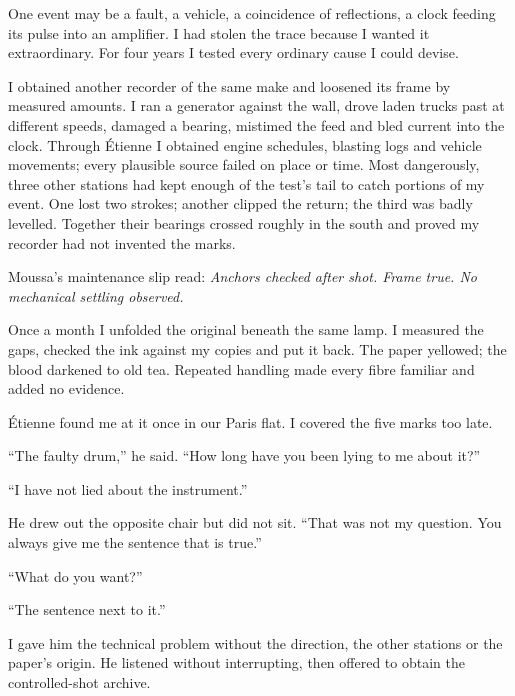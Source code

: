 One event may be a fault, a vehicle, a coincidence of reflections, a clock feeding its pulse into an amplifier. I had stolen the trace because I wanted it extraordinary. For four years I tested every ordinary cause I could devise.\par

I obtained another recorder of the same make and loosened its frame by measured amounts. I ran a generator against the wall, drove laden trucks past at different speeds, damaged a bearing, mistimed the feed and bled current into the clock. Through Étienne I obtained engine schedules, blasting logs and vehicle movements; every plausible source failed on place or time. Most dangerously, three other stations had kept enough of the test's tail to catch portions of my event. One lost two strokes; another clipped the return; the third was badly levelled. Together their bearings crossed roughly in the south and proved my recorder had not invented the marks.\par

Moussa's maintenance slip read: \emph{Anchors checked after shot. Frame true. No mechanical settling observed.}\par

Once a month I unfolded the original beneath the same lamp. I measured the gaps, checked the ink against my copies and put it back. The paper yellowed; the blood darkened to old tea. Repeated handling made every fibre familiar and added no evidence.\par

Étienne found me at it once in our Paris flat. I covered the five marks too late.\par

“The faulty drum,” he said. “How long have you been lying to me about it?”\par

“I have not lied about the instrument.”\par

He drew out the opposite chair but did not sit. “That was not my question. You always give me the sentence that is true.”\par

“What do you want?”\par

“The sentence next to it.”\par

I gave him the technical problem without the direction, the other stations or the paper's origin. He listened without interrupting, then offered to obtain the controlled-shot archive.\par

